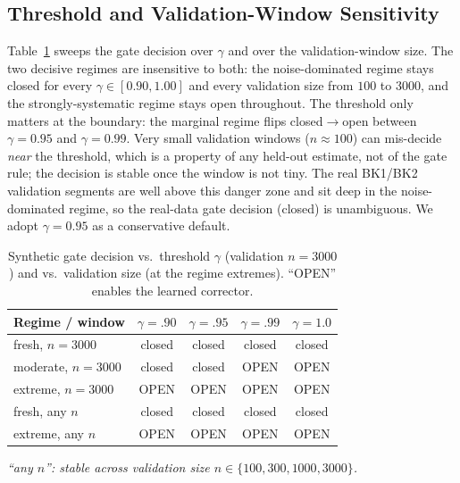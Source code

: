 \documentclass[conference]{IEEEtran}
\begin{document}
\subsection{Threshold and Validation-Window Sensitivity}
\label{sec:eval-sens}
Table~\ref{tab:gamma} sweeps the gate decision over $\gamma$ and over the
validation-window size. The two decisive regimes are insensitive to both: the
noise-dominated regime stays closed for every $\gamma\in[0.90,1.00]$ and every
validation size from $100$ to $3000$, and the strongly-systematic regime stays
open throughout. The threshold only matters at the boundary: the marginal regime
flips closed$\to$open between $\gamma=0.95$ and $\gamma=0.99$. Very small
validation windows ($n\!\approx\!100$) can mis-decide \emph{near} the threshold,
which is a property of any held-out estimate, not of the gate rule; the decision
is stable once the window is not tiny. The real BK1/BK2 validation segments are
well above this danger zone and sit deep in the noise-dominated regime, so the
real-data gate decision (closed) is unambiguous. We adopt $\gamma=0.95$ as a
conservative default.

\begin{table}[t]
\centering
\footnotesize
\setlength{\tabcolsep}{4pt}
\caption{Synthetic gate decision vs.\ threshold $\gamma$ (validation $n=3000$) and
vs.\ validation size (at the regime extremes). ``OPEN'' enables the learned
corrector.}
\label{tab:gamma}
\begin{tabular}{lcccc}
\toprule
Regime / window & $\gamma{=}.90$ & $\gamma{=}.95$ & $\gamma{=}.99$ & $\gamma{=}1.0$ \\
\midrule
fresh, $n{=}3000$    & closed & closed & closed & closed \\
moderate, $n{=}3000$ & closed & closed & OPEN & OPEN \\
extreme, $n{=}3000$  & OPEN & OPEN & OPEN & OPEN \\
\midrule
fresh, any $n$   & closed & closed & closed & closed \\
extreme, any $n$ & OPEN & OPEN & OPEN & OPEN \\
\bottomrule
\end{tabular}
\par\vspace{2pt}\raggedright\footnotesize\textit{``any $n$'': stable across
validation size $n\in\{100,300,1000,3000\}$.}
\end{table}
\end{document}
